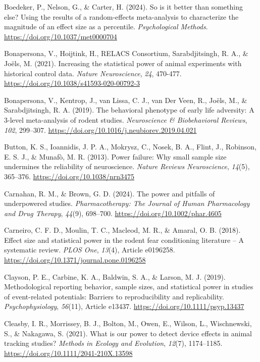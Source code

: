 \documentclass[authordate, meta]{jote-new-article}
\begin{document}
	Boedeker, P., Nelson, G., \& Carter, H. (2024). So is it better than something else? Using the results of a random-effects meta-analysis to characterize the magnitude of an effect size as a percentile. \emph{Psychological Methods}. \url{https://doi.org/10.1037/met0000704}



	Bonapersona, V., Hoijtink, H., RELACS Consortium, Sarabdjitsingh, R. A., \& Joëls, M. (2021). Increasing the statistical power of animal experiments with historical control data. \emph{Nature Neuroscience}, \emph{24}, 470-477. \url{https://doi.org/10.1038/s41593-020-00792-3}



	Bonapersona, V., Kentrop, J., van Lissa, C. J., van Der Veen, R., Joëls, M., \& Sarabdjitsingh, R. A. (2019). The behavioral phenotype of early life adversity: A 3-level meta-analysis of rodent studies. \emph{Neuroscience \& Biobehavioral Reviews}, \emph{102}, 299--307. \url{https://doi.org/10.1016/j.neubiorev.2019.04.021}



	Button, K. S., Ioannidis, J. P. A., Mokrysz, C., Nosek, B. A., Flint, J., Robinson, E. S. J., \& Munafò, M. R. (2013). Power failure: Why small sample size undermines the reliability of neuroscience. \emph{Nature Reviews Neuroscience}, \emph{14}(5), 365--376. \url{https://doi.org/10.1038/nrn3475}



	Carnahan, R. M., \& Brown, G. D. (2024). The power and pitfalls of underpowered studies. \emph{Pharmacotherapy: The Journal of Human Pharmacology and Drug Therapy}, \emph{44}(9), 698--700. \url{https://doi.org/10.1002/phar.4605}



	Carneiro, C. F. D., Moulin, T. C., Macleod, M. R., \& Amaral, O. B. (2018). Effect size and statistical power in the rodent fear conditioning literature -- A systematic review. \emph{PLOS One}, \emph{13}(4), Article e0196258. \url{https://doi.org/10.1371/journal.pone.0196258}



	Clayson, P. E., Carbine, K. A., Baldwin, S. A., \& Larson, M. J. (2019). Methodological reporting behavior, sample sizes, and statistical power in studies of event-related potentials: Barriers to reproducibility and replicability. \emph{Psychophysiology}, \emph{56}(11), Article e13437. \url{https://doi.org/10.1111/psyp.13437}



	Cleasby, I. R., Morrissey, B. J., Bolton, M., Owen, E., Wilson, L., Wischnewski, S., \& Nakagawa, S. (2021). What is our power to detect device effects in animal tracking studies? \emph{Methods in Ecology and Evolution}, \emph{12}(7), 1174--1185. \url{https://doi.org/10.1111/2041-210X.13598}
\end{document}
